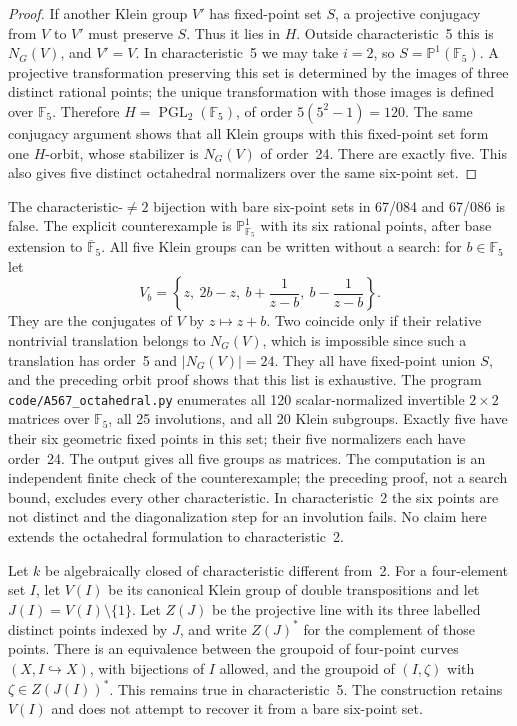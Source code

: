 \begin{proof}
If another Klein group $V'$ has fixed-point set $S$, a projective
conjugacy from $V$ to $V'$ must preserve $S$. Thus it lies in $H$.
Outside characteristic~5 this is $N_G(V)$, and $V'=V$.
In characteristic~5 we may take $i=2$, so $S=\mathbb P^1(\mathbb F_5)$.
A projective transformation preserving this set is determined by the
images of three distinct rational points; the unique transformation
with those images is defined over $\mathbb F_5$. Therefore
$H=\operatorname{PGL}_2(\mathbb F_5)$, of order $5(5^2-1)=120$.
The same conjugacy argument shows that all Klein groups with this
fixed-point set form one $H$-orbit, whose stabilizer is $N_G(V)$ of
order~24. There are exactly five. This also gives five distinct
octahedral normalizers over the same six-point set.
\end{proof}

\begin{remark}
\label{A:octahedron-certificate}
The characteristic-$\ne2$ bijection with bare six-point sets in
67/084 and 67/086 is false. The explicit counterexample is
$\mathbb P^1_{\mathbb F_5}$ with its six rational points, after base
extension to $\overline{\mathbb F}_5$. All five Klein groups can be
written without a search: for $b\in\mathbb F_5$ let
\[
 V_b=\left\{z,\ 2b-z,\ b+\frac1{z-b},\ b-\frac1{z-b}\right\}.
\]
They are the conjugates of $V$ by $z\mapsto z+b$. Two coincide only
if their relative nontrivial translation belongs to $N_G(V)$, which
is impossible since such a translation has order~5 and $|N_G(V)|=24$.
They all have fixed-point union $S$, and the preceding orbit proof
shows that this list is exhaustive. The program
\texttt{code/A567\_octahedral.py} enumerates all 120 scalar-normalized
invertible $2\times2$ matrices over $\mathbb F_5$, all 25 involutions,
and all 20 Klein subgroups. Exactly five have their six geometric fixed
points in this set; their five normalizers each have order~24.
The output gives all five groups as matrices. The computation is an
independent finite check of the counterexample; the preceding proof,
not a search bound, excludes every other characteristic.
In characteristic~2 the six points are not distinct and the
diagonalization step for an involution fails. No claim here extends
the octahedral formulation to characteristic~2.
\end{remark}

\begin{theorem}
\label{A:fourpoint-groupoid}
Let $k$ be algebraically closed of characteristic different from~2.
For a four-element set $I$, let $V(I)$ be its canonical Klein group of
double transpositions and let $J(I)=V(I)\setminus\{1\}$.
Let $Z(J)$ be the projective line with its three labelled distinct
points indexed by $J$, and write $Z(J)^*$ for the complement of those
points. There is an equivalence between the groupoid of four-point
curves $(X,I\hookrightarrow X)$, with bijections of $I$ allowed, and
the groupoid of $(I,\zeta)$ with $\zeta\in Z(J(I))^*$.
This remains true in characteristic~5. The construction retains
$V(I)$ and does not attempt to recover it from a bare six-point set.
\end{theorem}

